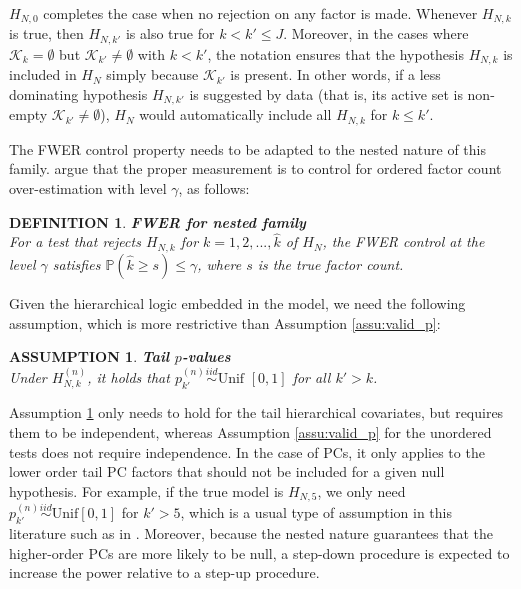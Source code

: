 \documentclass[11pt]{article}
\newcommand{\PP}{\mathbb{P}}
\newcommand{\iid}{\stackrel{iid}{\sim}}
\newtheorem{definition}{DEFINITION}
\newtheorem{assumption}{ASSUMPTION}
\begin{document}
	$H_{N,0}$ completes the case when no rejection on any factor is made. Whenever $H_{N,k}$ is true, then $H_{N,k'}$ is also true for $k<k'\leq J$. Moreover, in the cases where $\mathcal{K}_k=\emptyset$ but $\mathcal{K}_{k'}\neq\emptyset$ with $k<k'$, the notation ensures that the hypothesis $H_{N,k}$ is included in $H_N$ simply because $\mathcal{K}_{k'}$ is present. In other words, if a less dominating hypothesis $H_{N,k'}$ is suggested by data (that is, its active set is non-empty $\mathcal{K}_{k'}\neq\emptyset$), $H_N$ would automatically include all $H_{N,k}$ for $k\leq k'$.
	
	The FWER control property needs to be adapted to the nested nature of this family. \cite{16-AOS1536} argue that the proper measurement is to control for ordered factor count over-estimation with level $\gamma$, as follows:
	
	\begin{definition}{\bf FWER for nested family}\label{def10}\\
		For a test that rejects $H_{N,k}$ for $k=1,2,...,\hat{k}$ of $H_{N}$, the FWER control at the level $\gamma$ satisfies $\PP(\hat{k}\geq s)\leq \gamma$, where $s$ is the true factor count.
	\end{definition}
	
	Given the hierarchical logic embedded in the model, we need  the following assumption, which is more restrictive than Assumption \ref{assu:valid_p}:
	
	\begin{assumption}{\bf Tail $p$-values}\label{asu8}\\
		Under $	H_{N,k}^{(n)}$, it holds that $p^{(n)}_{k'}\iid\text{Unif }[0,1]$ for all $k'>k$.
	\end{assumption}
	
	Assumption \ref{asu8} only needs to hold for the tail hierarchical covariates, but requires them to be independent, whereas Assumption \ref{assu:valid_p} for the unordered tests does not require independence. In the case of PCs, it only applies to the lower order tail PC factors that should not be included for a given null hypothesis. For example, if the true model is $H_{N,5}$, we only need $p^{(n)}_{k'}\iid \text{Unif}[0,1]$ for $k'>5$, which is a usual type of assumption in this literature such as in \cite{rssb.12122}. Moreover, because the nested nature guarantees that the higher-order PCs are more likely to be null, a step-down procedure is expected to increase the power relative to a step-up procedure. 
	
\end{document}
